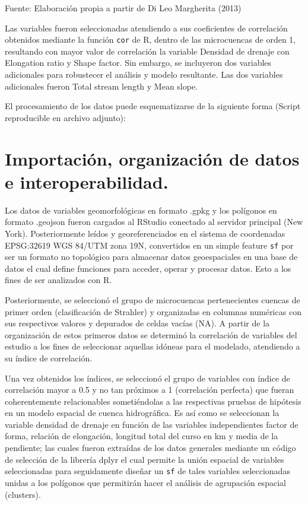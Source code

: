 \documentclass[11pt,]{article}
\begin{document}
Fuente: Elaboración propia a partir de Di Leo Margherita (2013)

Las variables fueron seleccionadas atendiendo a sus coeficientes de
correlación obtenidos mediante la función \texttt{cor} de R, dentro de
las microcuencas de orden 1, resultando con mayor valor de correlación
la variable Densidad de drenaje con Elongation ratio y Shape factor. Sin
embargo, se incluyeron dos variables adicionales para robustecer el
análisis y modelo resultante. Las dos variables adicionales fueron Total
stream length y Mean slope.

El procesamiento de los datos puede esquematizarse de la siguiente forma
(Script reproducible en archivo adjunto):

\section{Importación, organización de datos e
interoperabilidad.}\label{importaciuxf3n-organizaciuxf3n-de-datos-e-interoperabilidad.}

Los datos de variables geomorfológicas en formato .gpkg y los polígonos
en formato .geojson fueron cargados al RStudio conectado al servidor
principal (New York). Posteriormente leídos y georeferenciados en el
sistema de coordenadas EPSG:32619 WGS 84/UTM zona 19N, convertidos en un
simple feature \texttt{sf} por ser un formato no topológico para
almacenar datos geoespaciales en una base de datos el cual define
funciones para acceder, operar y procesar datos. Esto a los fines de ser
analizados con R.

Posteriormente, se seleccionó el grupo de microcuencas pertenecientes
cuencas de primer orden (clasificación de Strahler) y organizadas en
columnas numéricas con sus respectivos valores y depurados de celdas
vacías (NA). A partir de la organización de estos primeros datos se
determinó la correlación de variables del estudio a los fines de
seleccionar aquellas idóneas para el modelado, atendiendo a su índice de
correlación.

Una vez obtenidos los índices, se seleccionó el grupo de variables con
índice de correlación mayor a 0.5 y no tan próximos a 1 (correlación
perfecta) que fueran coherentemente relacionables sometiéndolas a las
respectivas pruebas de hipótesis en un modelo espacial de cuenca
hidrográfica. Es así como se seleccionan la variable densidad de drenaje
en función de las variables independientes factor de forma, relación de
elongación, longitud total del curso en km y media de la pendiente; las
cuales fueron extraídas de los datos generales mediante un código de
selección de la librería dplyr el cual permite la unión espacial de
variables seleccionadas para seguidamente diseñar un \texttt{sf} de
tales variables seleccionadas unidas a los polígonos que permitirán
hacer el análisis de agrupación espacial (clusters).
\end{document}
